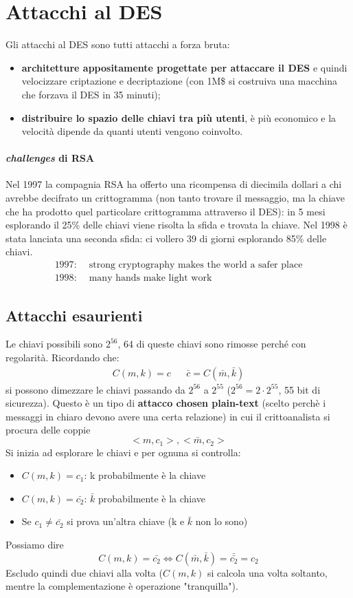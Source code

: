 \section{Attacchi al DES}
Gli attacchi al DES sono tutti attacchi a forza bruta:
\begin{itemize}
    \item \textbf{architetture appositamente progettate per attaccare il DES} e quindi velocizzare criptazione e decriptazione (con 1M\$ si costruiva una macchina che forzava il DES in 35 minuti);
    \item \textbf{distribuire lo spazio delle chiavi tra più utenti}, è più economico e la velocità dipende da quanti utenti vengono coinvolto.
\end{itemize}
\paragraph{\emph{challenges} di RSA} Nel 1997 la compagnia RSA ha offerto una ricompensa di diecimila dollari a chi avrebbe decifrato un crittogramma (non tanto trovare il messaggio, ma la chiave che ha prodotto quel particolare crittogramma attraverso il DES): in 5 mesi esplorando il 25\% delle chiavi viene risolta la sfida e trovata la chiave. Nel 1998 è stata lanciata una seconda sfida: ci vollero 39 di giorni esplorando 85\% delle chiavi.
\begin{align*}
	1997:\,\,&\text{strong cryptography makes the world a safer place}\\1998:\,\,&\text{many hands make light work}
\end{align*}

\subsection{Attacchi esaurienti} Le chiavi possibili sono $2^{56}$, 64 di queste chiavi sono rimosse perché con regolarità. Ricordando che:
\begin{align*}\boxed{C(m, k) = c}&&\boxed{\bar{c} = C(\bar{m}, \bar{k})}\end{align*}
si possono dimezzare le chiavi passando da $2^{56}$ a $2^{55}$ ($2^{56}=2\cdot 2^{55}$, 55 bit di sicurezza). Questo è un tipo di \textbf{attacco chosen plain-text} (scelto perchè i messaggi in chiaro devono avere una certa relazione) in cui il crittoanalista si procura delle coppie $$<m, c_1>, <\bar{m}, c_2>$$ Si inizia ad esplorare le chiavi e per ognuna si controlla:
\begin{itemize}
    \item $C(m, k) = c_1$: k probabilmente è la chiave
    \item $C(m, k) = \bar{c_2}$: $\bar{k}$ probabilmente è la chiave
    \item Se $c_1 \neq \bar{c_2}$ si prova un'altra chiave (k e $\bar{k}$ non lo sono)    
\end{itemize}
Possiamo dire
$$C(m,k) = \bar{c_2} \iff C(\bar{m},\bar{k}) = \bar{\bar{c_2}} = c_2$$
Escludo quindi due chiavi alla volta ($C(m,k)$ si calcola una volta soltanto, mentre la complementazione è operazione "tranquilla").

